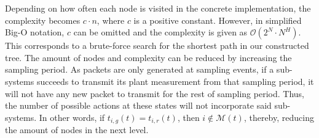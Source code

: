 Depending on how often each node is visited in the concrete implementation, the
complexity becomes $c \cdot n$, where $c$ is a positive constant. However, in
simplified Big-O notation, $c$ can be omitted and the complexity is given as
$\mathcal{O}(2^N\cdot N^H)$. This corresponds to a brute-force search for the shortest
path in our constructed tree. The amount of nodes and complexity can be reduced
by increasing the sampling period. As packets are only generated at sampling
events, if a sub-systems succeeds to transmit its plant measurement from that
sampling period, it will not have any new packet to transmit for the rest of
sampling period. Thus, the number of possible actions at these states will not
incorporate said sub-systems. In other words, if $t_{i,g}(t) = t_{i,r}(t)$, then
$i \not \in \mathcal{M}(t)$, thereby, reducing the amount of nodes in the next
level.
